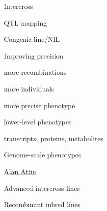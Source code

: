 \documentclass[12pt,t,aspectratio=169]{beamer}
\begin{document}
\begin{frame}[c]{Intercross}
\end{frame}





\begin{frame}[c]{QTL mapping}

\vspace{5mm}
\end{frame}


\begin{frame}[c]{Congenic line/NIL}


\end{frame}



\begin{frame}[c]{Improving precision}

  \vspace{-20mm}

  \bbi
\item more recombinations
\item more individuals
\item more precise phenotype
\item lower-level phenotypes
\bi
\item transcripts, proteins, metabolites
  \ei
  \ei

\end{frame}



\begin{frame}[c]{Genome-scale phenotypes}

\vspace*{5mm}

\hfill
\href{https://biochem.wisc.edu/faculty/attie}{\scriptsize \lolit Alan
  Attie} \hspace{8mm}

\end{frame}




\begin{frame}[c]{Advanced intercross lines}


\end{frame}


\begin{frame}[c]{Recombinant inbred lines}


\end{frame}
\end{document}

